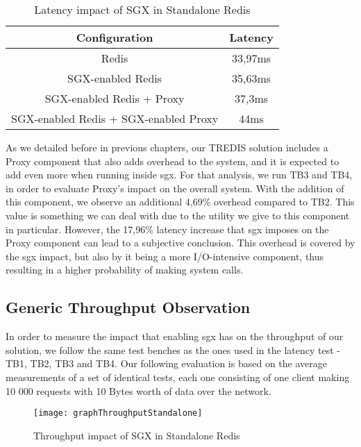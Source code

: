 \begin{table}[ht]
	\caption{Latency impact of SGX in Standalone Redis} %
	\centering %
	\begin{tabular}{c c} %
		\hline\hline %
		\textbf{Configuration} & \textbf{Latency} \\ [0.5ex] %
		\hline
		Redis & 33,97ms\\
		\hline
		SGX-enabled Redis & 35,63ms \\
		\hline
	    SGX-enabled Redis + Proxy & 37,3ms \\
		\hline %
	    SGX-enabled Redis + SGX-enabled Proxy & 44ms\\ [1ex] %
		\hline %
	\end{tabular}
	\label{table:latencySingleRedis} %
\end{table}

As we detailed before in previous chapters, our TREDIS solution includes a Proxy component that also adds overhead to the system, and it is expected to add even more when running inside \gls{sgx}. For that analysis, we run TB3 and TB4, in order to evaluate Proxy's impact on the overall system. With the addition of this component, we observe an additional 4,69\% overhead compared to TB2. This value is something we can deal with due to the utility we give to this component in particular. However, the 17,96\% latency increase that \gls{sgx} imposes on the Proxy component can lead to a subjective conclusion. This overhead is covered by the \gls{sgx} impact, but also by it being a more I/O-intensive component, thus resulting in a higher probability of making system calls.

\subsection{Generic Throughput Observation}

In order to measure the impact that enabling \gls{sgx} has on the throughput of our solution, we follow the same test benches as the ones used in the latency test - TB1, TB2, TB3 and TB4. Our following evaluation is based on the average measurements of a set of identical tests, each one consisting of one client making 10 000 requests with 10 Bytes worth of data over the network.

\begin{figure}[htbp]
	\centering
	{\texttt{[image: graphThroughputStandalone]}}
	\caption{Throughput impact of SGX in Standalone Redis}
	\label{fig:graphThroughputStandalone}
\end{figure}

